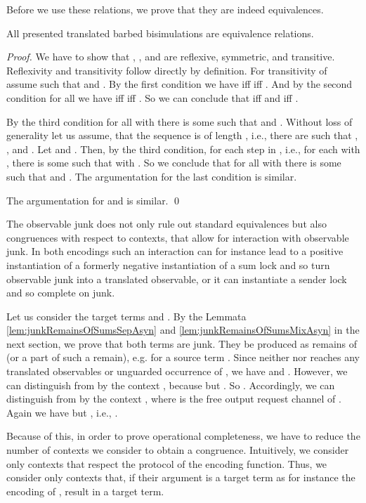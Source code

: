 \documentclass[]{llncs}
\begin{document}
Before we use these relations, we prove that they are indeed equivalences.

\begin{lemma} \label{lem:transBarbBisimIsEquivalence}
	All presented translated barbed bisimulations are equivalence relations.
\end{lemma}

\begin{proof}
	We have to show that , , and  are reflexive, symmetric, and transitive. Reflexivity and transitivity follow directly by definition. For transitivity of  assume  such that  and . By the first condition we have  iff  iff . And by the second condition for all  we have  iff  iff . So we can conclude that  iff  and  iff .
	
	By the third condition for all  with  there is some  such that  and . Without loss of generality let us assume, that the sequence  is of length , i.e., there are  such that , , and . Let  and . Then, by the third condition, for each step in , i.e., for each  with , there is some  such that  with . So we conclude that for all  with  there is some  such that  and . The argumentation for the last condition is similar.
	
	The argumentation for  and  is similar.
	\qed
\end{proof}

The observable junk does not only rule out standard equivalences but also congruences with respect to contexts, that allow for interaction with observable junk. In both encodings such an interaction can for instance lead to a positive instantiation of a formerly negative instantiation of a sum lock and so turn observable junk into a translated observable, or it can instantiate a sender lock and so complete \simulations on junk.
\begin{example}
	Let us consider the target terms  and . By the Lemmata \ref{lem:junkRemainsOfSumsSepAsyn} and \ref{lem:junkRemainsOfSumsMixAsyn} in the next section, we prove that both terms are junk. They be produced as remains of \simulations (or a part of such a remain), e.g. for a source term . Since neither  nor  reaches any translated observables or unguarded occurrence of , we have  and . However, we can distinguish  from  by the context , because  but . So . Accordingly, we can distinguish  from  by the context , where  is the free output request channel of . Again we have  but , i.e., .
\end{example}
Because of this, in order to prove operational completeness, we have to reduce the number of contexts we consider to obtain a congruence. Intuitively, we consider only contexts that respect the protocol of the encoding function. Thus, we consider only contexts that, if their argument is a target term as for instance the encoding of , result in a target term.
\end{document}
